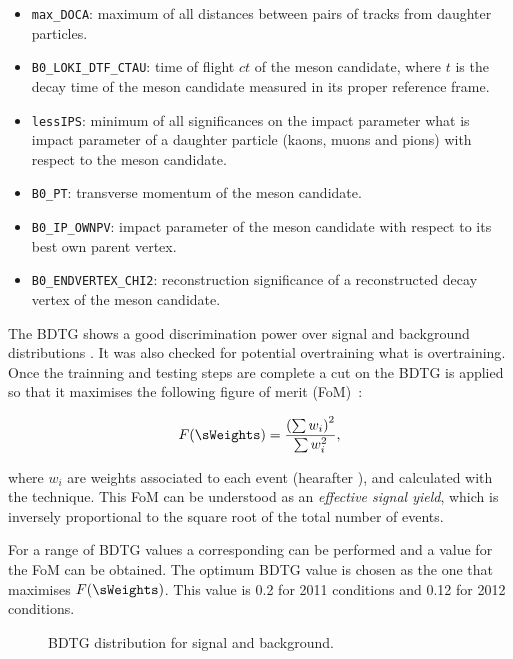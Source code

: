 \begin{itemize}
\item{} \texttt{max\_DOCA}: maximum of all distances between pairs of tracks from daughter particles.
\item{} \texttt{B0\_LOKI\_DTF\_CTAU}: time of flight $ct$ of the \Bs meson candidate, where
$t$ is the decay time of the \Bs meson candidate measured in its proper reference frame.
\item{} \texttt{lessIPS}: minimum of all significances on the impact parameter {\color{red} what is impact parameter} of a daughter particle (kaons, muons and pions) with respect to the \Bs meson candidate.
\item{} \texttt{B0\_PT}: transverse momentum of the \Bs meson candidate.
\item{} \texttt{B0\_IP\_OWNPV}: impact parameter of the \Bs meson candidate with respect to its best own parent vertex.
\item{} \texttt{B0\_ENDVERTEX\_CHI2}: reconstruction significance of a reconstructed decay vertex of the \Bs meson candidate.
\end{itemize}

The BDTG shows a good discrimination power over signal and background distributions . It was also checked for potential overtraining {\color{red} what is overtraining}.
Once the trainning and testing steps are complete a cut on the BDTG is applied so that it maximises the following figure of merit
(FoM)~\cite{Yuehong_fom}:

\begin{equation}
\label{eqn:fom}
F(\sWeights) = \frac{\left(\sum{w_{i}}\right)^2}{\sum{w_{i}^2}},
\end{equation}

\noindent where $w_i$ are weights associated to each event (hearafter \sWeights), and calculated with the \sPlot technique. 
This FoM can be understood as an {\it{effective signal yield}}, which is inversely proportional to the square root of the total number of events. 


For a range of BDTG values a corresponding \sPlot can be performed and a value for the FoM can be obtained.
The optimum BDTG value is chosen as the one that maximises $F(\sWeights)$. 
This value is 0.2 for 2011 conditions and 0.12 for 2012 conditions.

\begin{figure}[h]
\begin{center}
\caption{BDTG distribution for signal and background.}
\label{BTDG_performance}
\end{center}
\end{figure}

